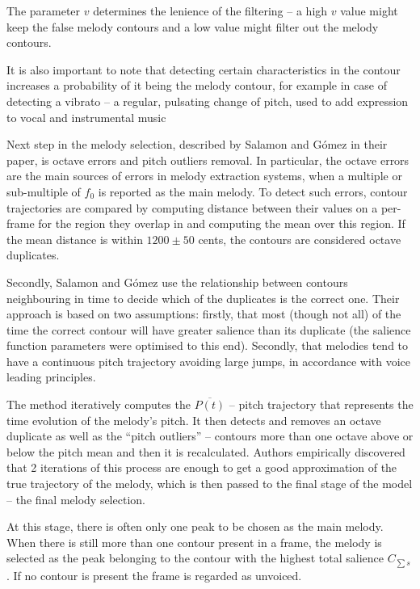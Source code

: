 The parameter $v$ determines the lenience of the filtering -- a high $v$ value might keep the false melody contours and a low value might filter out the melody contours.

It is also important to note that detecting certain characteristics in the contour increases a probability of it being the melody contour, for example in case of detecting a vibrato -- a regular, pulsating change of pitch, used to add expression to vocal and instrumental music~\cite{vibrato}

Next step in the melody selection, described by Salamon and G\'{o}mez in their paper, is octave errors and pitch outliers removal. In particular, the octave errors are the main sources of errors in melody extraction systems, when a multiple or sub-multiple of $f_{0}$ is reported as the main melody. To detect such errors, contour trajectories are compared by computing distance between their values on a per-frame for the region they overlap in and computing the mean over this region. If the mean distance is within $1200\pm50$ cents, the contours are considered octave duplicates.

Secondly, Salamon and G\'{o}mez use the relationship between contours neighbouring in time to decide which of the duplicates is the correct one. Their approach is based on two assumptions: firstly, that most (though not all) of the time the correct contour will have greater salience than its duplicate (the salience function parameters were optimised to this end). Secondly, that melodies tend to have a continuous pitch trajectory avoiding large jumps, in accordance with voice leading principles.

The method iteratively computes the $\overline{P(t)}$ -- pitch trajectory that represents the time evolution of the melody's pitch. It then detects and removes an octave duplicate as well as  the ``pitch outliers'' -- contours more than one octave above or below the pitch mean and then it is recalculated. Authors empirically discovered that 2 iterations of this process are enough to get a good approximation of the true trajectory of the melody, which is then passed to the final stage of the model -- the final melody selection.

At this stage, there is often only one peak to be chosen as the main melody. When there is still more than one contour present in a frame, the melody is selected as the peak belonging to the contour with the highest total salience $C_{\sum s}$. If no contour is present the frame is regarded as unvoiced.

